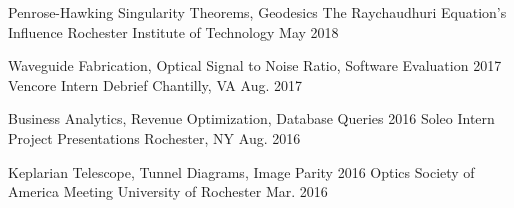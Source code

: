 \begin{cventries}
\cventry
   {Penrose-Hawking Singularity Theorems, Geodesics}
   {The Raychaudhuri Equation's Influence}
   {Rochester Institute of Technology}
   {May 2018}
   {
   }

 \cventry
    {Waveguide Fabrication, Optical Signal to Noise Ratio, Software Evaluation}
    {2017 Vencore Intern Debrief}
    {Chantilly, VA}
    {Aug. 2017}
    {
    }


 \cventry
    {Business Analytics, Revenue Optimization, Database Queries}
    {2016 Soleo Intern Project Presentations}
    {Rochester, NY}
    {Aug. 2016}
    {
    }

 \cventry
    {Keplarian Telescope, Tunnel Diagrams, Image Parity}
    {2016 Optics Society of America Meeting}
    {University of Rochester}
    {Mar. 2016}
    {
    }    

    
  
\end{cventries}
